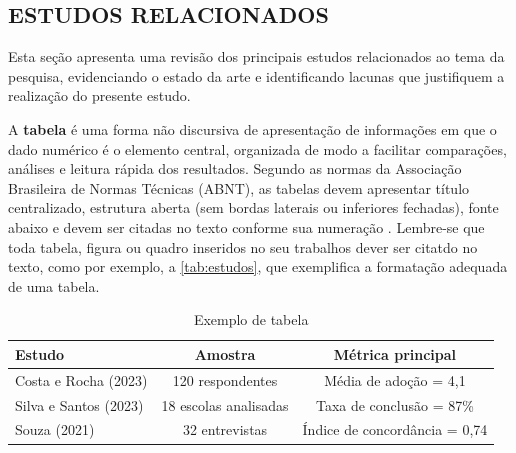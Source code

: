 \subsection{ESTUDOS RELACIONADOS}
\label{subsec:estudos-relacionados} 

Esta seção apresenta uma revisão dos principais estudos relacionados ao tema da pesquisa, evidenciando o estado da arte e identificando lacunas que justifiquem a realização do presente estudo.

A \textbf{tabela} é uma forma não discursiva de apresentação de informações em que o dado numérico é o elemento central, organizada de modo a facilitar comparações, análises e leitura rápida dos resultados. Segundo as normas da Associação Brasileira de Normas Técnicas (ABNT), as tabelas devem apresentar título centralizado, estrutura aberta (sem bordas laterais ou inferiores fechadas), fonte abaixo e devem ser citadas no texto conforme sua numeração \cite{ABNT_NBR14724_2011,ABNT_NBR15287_2011,ABNT_NBR6024_2012}. Lembre-se que toda tabela, figura ou quadro inseridos no seu trabalhos dever ser citatdo no texto, como por exemplo, a \autoref{tab:estudos}, que exemplifica a formatação adequada de uma tabela. 

\begin{table}[htbp] %
    \centering
    \caption{Exemplo de tabela}
    \label{tab:estudos}
    \begin{tabular}{p{4cm}cc}
        \toprule
        \textbf{Estudo} & \textbf{Amostra} & \textbf{Métrica principal} \\ %
        \midrule
        Costa e Rocha (2023) & 120 respondentes & Média de adoção = 4,1 \\
        Silva e Santos (2023) & 18 escolas analisadas & Taxa de conclusão = 87\% \\
        Souza (2021) & 32 entrevistas & Índice de concordância = 0,74 \\
        \bottomrule
    \end{tabular}
\end{table}




